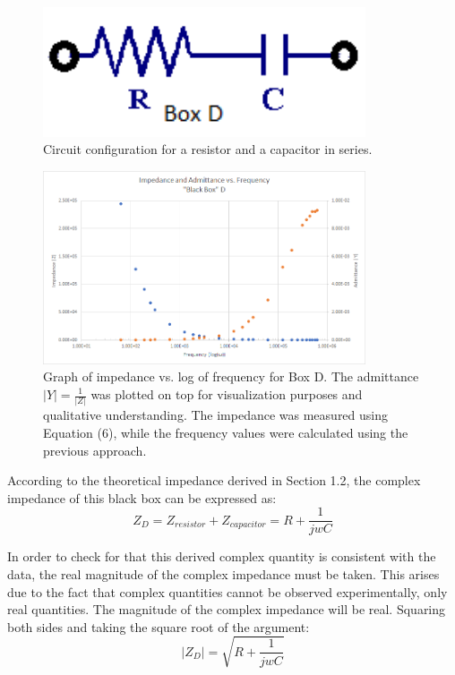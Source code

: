 \documentclass[a4paper]{article}
\begin{document}
\begin{figure}[h]
\centering
\includegraphics[width=0.85\textwidth]{boxdconfig}
\caption{Circuit configuration for a resistor and a capacitor in series.}
\end{figure}

\begin{figure}[h]
\centering
\includegraphics[width=0.85\textwidth]{boxdplot}
\caption{Graph of impedance vs. log of frequency for Box D. The admittance $|Y|=\frac{1}{|Z|}$ was plotted on top for visualization purposes and qualitative understanding. The impedance was measured using Equation (6), while the frequency values were calculated using the previous approach. }
\end{figure}

According to the theoretical impedance derived in Section 1.2, the complex impedance of this black box can be expressed as:
\begin{equation}
Z_{D} = Z_{resistor}+Z_{capacitor}=R+\frac{1}{jwC}
\end{equation}

In order to check for that this derived complex quantity is consistent with the data, the real magnitude of the complex impedance must be taken. This arises due to the fact that complex quantities cannot be observed experimentally, only real quantities. The magnitude of the complex impedance will be real. Squaring both sides and taking the square root of the argument:
\begin{equation}
|Z_{D}| = \sqrt{R+\frac{1}{jwC}}
\end{equation}
\end{document}

